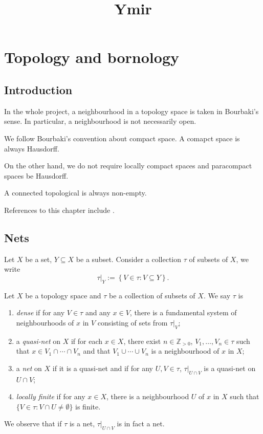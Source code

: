 
\title{Ymir}

\maketitle
\tableofcontents

\chapter*{Topology and bornology}\label{chap-topology}

\section{Introduction}\label{sec-introduction-Topology}

In the whole project, a neighbourhood in a topology space is taken in Bourbaki's sense. In particular, a neighbourhood is not necessarily open.

We follow Bourbaki's convention about compact space. A comapct space is always Hausdorff. 

On the other hand, we do not require locally compact spaces and paracompact spaces be Hausdorff.

A connected topological is always non-empty.

References to this chapter include \cite{Berk93}.

\section{Nets}\label{sec-nets}

Let $X$ be a set, $Y\subseteq X$ be a subset. Consider a collection $\tau$ of subsets of $X$, we write
\[
    \tau|_Y:=\left\{V\in \tau: V\subseteq Y \right\}.    
\]

\begin{definition}
    Let $X$ be a topology space and $\tau$ be a collection of subsets of $X$. We say $\tau$ is
    \begin{enumerate}
        \item \emph{dense} if for any $V\in \tau$ and any $x\in V$, there is a fundamental system of neighbourhoods of $x$ in $V$ consisting of sets from $\tau|_V$;
        \item a \emph{quasi-net} on $X$ if for each $x\in X$, there exist $n\in \mathbb{Z}_{>0}$, $V_1,\ldots,V_n\in \tau$ such that $x\in V_1\cap \cdots\cap V_n$ and that $V_1\cup\cdots\cup V_n$ is a neighbourhood of $x$ in $X$;
        \item a \emph{net} on $X$ if it is a quasi-net and if for any $U,V\in \tau$, $\tau|_{U\cap V}$ is a quasi-net on $U\cap V$;
        \item \emph{locally finite} if for any $x\in X$, there is a neighbourhood $U$ of $x$ in $X$ such that $\{V\in \tau:V\cap U\neq \emptyset\}$ is finite.
    \end{enumerate}
\end{definition}
We observe that if $\tau$ is a net, $\tau|_{U\cap V}$ is in fact a net.

